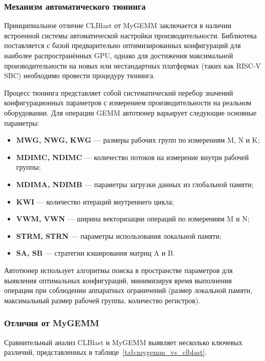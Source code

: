 \subsubsection{Механизм автоматического тюнинга}

Принципиальное отличие CLBlast от MyGEMM заключается в наличии встроенной системы автоматической настройки производительности. Библиотека поставляется с базой предварительно оптимизированных конфигураций для наиболее распространённых GPU, однако для достижения максимальной производительности на новых или нестандартных платформах (таких как RISC-V SBC) необходимо провести процедуру тюнинга.

Процесс тюнинга представляет собой систематический перебор значений конфигурационных параметров с измерением производительности на реальном оборудовании. Для операции GEMM автотюнер варьирует следующие основные параметры:

\begin{itemize}
    \item \textbf{MWG, NWG, KWG} --- размеры рабочих групп по измерениям M, N и K;
    \item \textbf{MDIMC, NDIMC} --- количество потоков на измерение внутри рабочей группы;
    \item \textbf{MDIMA, NDIMB} --- параметры загрузки данных из глобальной памяти;
    \item \textbf{KWI} --- количество итераций внутреннего цикла;
    \item \textbf{VWM, VWN} --- ширина векторизации операций по измерениям M и N;
    \item \textbf{STRM, STRN} --- параметры использования локальной памяти;
    \item \textbf{SA, SB} --- стратегии кэширования матриц A и B.
\end{itemize}

Автотюнер использует алгоритмы поиска в пространстве параметров для выявления оптимальных конфигураций, минимизируя время выполнения операции при соблюдении аппаратных ограничений (размер локальной памяти, максимальный размер рабочей группы, количество регистров).

\subsubsection{Отличия от MyGEMM}

Сравнительный анализ CLBlast и MyGEMM выявляет несколько ключевых различий, представленных в таблице~\ref{tab:mygemm_vs_clblast}.

